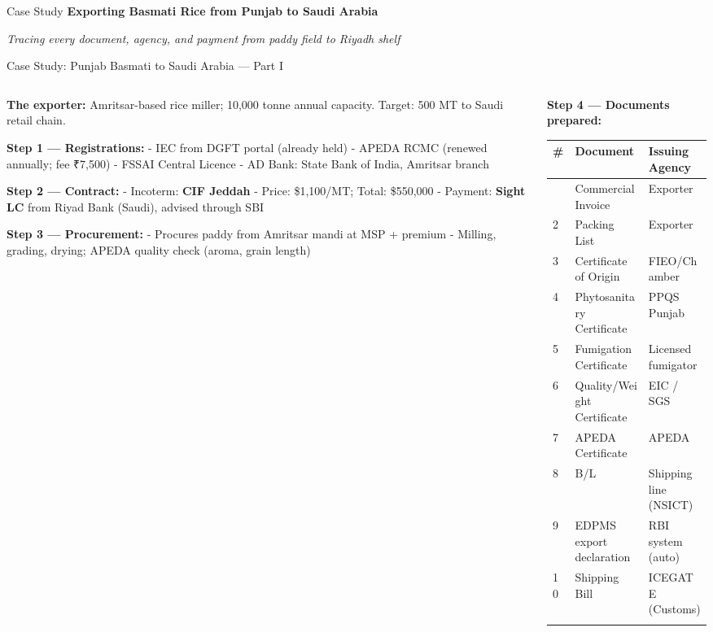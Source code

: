 \documentclass[
  ignorenonframetext,
  aspectratio=169,
]{beamer}
\makeatletter
\let\quarto@originallabel\label
\DeclareRobustCommand*{\label}[1]{\quarto@originallabel{#1}}
\makeatother
\begin{document}
\begin{frame}{Case Study}
\label{case-study}
\textbf{Exporting Basmati Rice from Punjab to Saudi Arabia}

\emph{Tracing every document, agency, and payment from paddy field to
Riyadh shelf}
\end{frame}

\begin{frame}
\begin{block}{Case Study: Punjab Basmati to Saudi Arabia --- Part I}
\label{case-study-punjab-basmati-to-saudi-arabia-part-i}
\begin{columns}[T]
\begin{column}{0.55\linewidth}
\textbf{The exporter:} Amritsar-based rice miller; 10,000 tonne annual
capacity. Target: 500 MT to Saudi retail chain.

\textbf{Step 1 --- Registrations:} - IEC from DGFT portal (already held)
- APEDA RCMC (renewed annually; fee ₹7,500) - FSSAI Central Licence - AD
Bank: State Bank of India, Amritsar branch

\textbf{Step 2 --- Contract:} - Incoterm: \textbf{CIF Jeddah} - Price:
\$1,100/MT; Total: \$550,000 - Payment: \textbf{Sight LC} from Riyad
Bank (Saudi), advised through SBI

\textbf{Step 3 --- Procurement:} - Procures paddy from Amritsar mandi at
MSP + premium - Milling, grading, drying; APEDA quality check (aroma,
grain length)
\end{column}

\begin{column}{0.45\linewidth}
\textbf{Step 4 --- Documents prepared:}

\begin{longtable}[]{@{}lll@{}}
\toprule\noalign{}
\# & Document & Issuing Agency \\
\midrule\noalign{}
\endhead
1 & Commercial Invoice & Exporter \\
2 & Packing List & Exporter \\
3 & Certificate of Origin & FIEO/Chamber \\
4 & Phytosanitary Certificate & PPQS Punjab \\
5 & Fumigation Certificate & Licensed fumigator \\
6 & Quality/Weight Certificate & EIC / SGS \\
7 & APEDA Certificate & APEDA \\
8 & B/L & Shipping line (NSICT) \\
9 & EDPMS export declaration & RBI system (auto) \\
10 & Shipping Bill & ICEGATE (Customs) \\
\bottomrule\noalign{}
\end{longtable}
\end{column}
\end{columns}
\end{block}
\end{frame}
\end{document}
